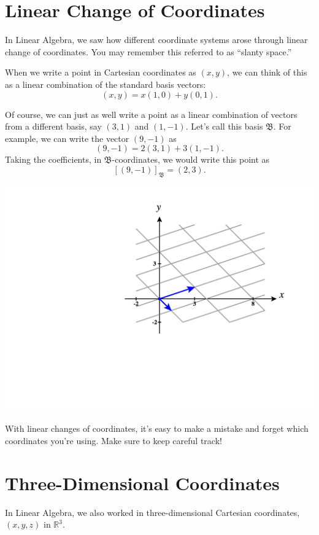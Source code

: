 \documentclass{ximera}
\begin{document}
\section*{Linear Change of Coordinates}

In Linear Algebra, we saw how different coordinate systems arose through linear change of coordinates. You may remember this referred to as ``slanty space.''

When we write a point in Cartesian coordinates as $(x,y)$, we can think of this as a linear combination of the standard basis vectors:
\[
(x,y) = x(1,0) + y(0,1).
\]

Of course, we can just as well write a point as a linear combination of vectors from a different basis, say $(3,1)$ and $(1, -1)$. Let's call this basis $\mathfrak{B}$. For example, we can write the vector $(9,-1)$ as
\[
(9,-1) = 2(3,1)+3(1,-1).
\]
Taking the coefficients, in $\mathfrak{B}$-coordinates, we would write this point as
\[
[(9,-1)]_{\mathfrak{B}}=(2,3).
\]

\begin{image}
\includegraphics[width=\textwidth]{CalcPlot3D-slanty_space}
\end{image}

With linear changes of coordinates, it's easy to make a mistake and forget which coordinates you're using. Make sure to keep careful track!

\section*{Three-Dimensional Coordinates}

In Linear Algebra, we also worked in three-dimensional Cartesian coordinates, $(x,y,z)$ in $\mathbb{R}^3$.
\end{document}
